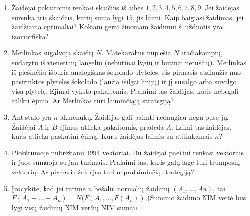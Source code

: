 \begin{enumerate}
  \item Žaidėjai pakaitomis renkasi skaičius iš aibės ${1, 2, 3, 4, 5, 6, 7,
    8, 9}$. Jei žaidėjas surenka tris skaičius, kurių suma lygi $15$, jis
    laimi.  Kaip baigiasi žaidimas, jei žaidžiama optimaliai? Kokiam gerai
    žinomam žaidimui ši užduotis yra izomorfiška?

  \item Merlinkas sugalvoja skaičių $N$. Matekaralius nupiešia $N$
    stačiakampių, sudarytų iš vienetinių langelių (nebūtinai lygių ir būtinai
    netuščių). Merlinkas iš piešinėlių išburia analogiškas šokolado plyteles.
    Jis pirmasis atsilaužia nuo pasirinktos plytelės šokolado (laužia išilgai
    linijų) ir jį suvalgo arba suvalgo visą plytelę. Ėjimai vyksta
    pakaitomis. Pralaimi tas žaidėjas, kuris nebegali atlikti ėjimo.  Ar
    Merlinkas turi laiminčiąją strategiją?  

  \item Ant stalo yra $n$ akmenukų. Žaidėjas gali paimti nedaugiau negu pusę
    jų. Žaidėjai $A$ ir $B$ ėjimus atlieka pakaitomis, pradeda $A$.  Laimi
    tas žaidėjas, kuris atlieka paskutinį ėjimą. Kuris žaidėjas laimės su
    atitinkamais $n$?

  \item Plokštumoje nubrėžiami $1994$ vektoriai. Du žaidėjai paeiliui renkasi
    vektorius ir juos sumuoja su jau turimais. Pralaimi tas, kuris galų lage
    turi trumpesnį vektorių. Ar pirmasis žaidėjas turi nepralaiminčią
    strategiją?

  \item Įrodykite, kad jei turime $n$ bešalių normalių žaidimų
    $(A_{1},\ldots,A{n})$, tai
    $F(A_{1}+\ldots+A_{n})=N(F(A_{1},\ldots,F(A_{n}))$ (Suminio žaidimo NIM
    vertė bus lygi visų žaidimų NIM verčių NIM sumai)


\end{enumerate}
